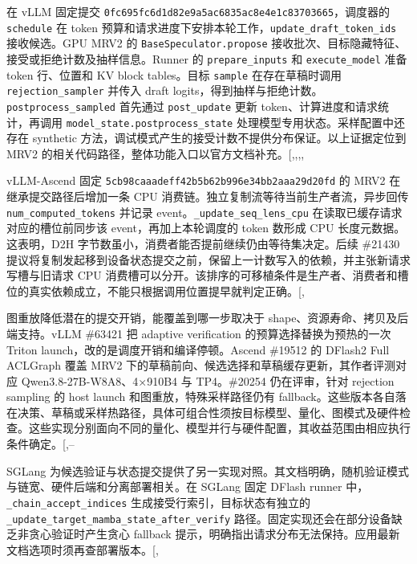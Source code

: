 \documentclass[
  a4paper,
  UTF8,
  fontset=none,
  zihao=5]{ctexart}
\begin{document}
在 vLLM 固定提交
\texttt{0fc695fc6d1d82e9a5ac6835ac8e4e1c83703665}，调度器的
\texttt{schedule} 在 token
预算和请求进度下安排本轮工作，\texttt{update\_draft\_token\_ids}
接收候选。GPU MRV2 的 \texttt{BaseSpeculator.propose}
接收批次、目标隐藏特征、接受或拒绝计数及抽样信息。Runner 的
\texttt{prepare\_inputs} 和 \texttt{execute\_model} 准备 token
行、位置和 KV block tables。目标 \texttt{sample} 在存在草稿时调用
\texttt{rejection\_sampler} 并传入 draft
logits，得到抽样与拒绝计数。\texttt{postprocess\_sampled} 首先通过
\texttt{post\_update} 更新 token、计算进度和请求统计，再调用
\texttt{model\_state.postprocess\_state}
处理模型专用状态。采样配置中还存在 synthetic
方法，调试模式产生的接受计数不提供分布保证。以上证据定位到 MRV2
的相关代码路径，整体功能入口以官方文档补充。{[},,,,\citeproc{ref-vllm-draft}{66}{]}

vLLM-Ascend 固定 \texttt{5cb98caaadeff42b5b62b996e34bb2aaa29d20fd} 的
MRV2 在继承提交路径后增加一条 CPU
消费链。独立复制流等待当前生产者流，异步回传
\texttt{num\_computed\_tokens} 并记录
event。\texttt{\_update\_seq\_lens\_cpu}
在读取已缓存请求对应的槽位前同步该 event，再加上本轮调度的 token 数形成
CPU 长度元数据。这表明，D2H
字节数虽小，消费者能否提前继续仍由等待集决定。后续 \#21430
提议将复制发起移到设备状态提交之前，保留上一计数写入的依赖，并主张新请求写槽与旧请求
CPU
消费槽可以分开。该排序的可移植条件是生产者、消费者和槽位的真实依赖成立，不能只根据调用位置提早就判定正确。{[},\citeproc{ref-pr-d2h}{31}{]}

图重放降低潜在的提交开销，能覆盖到哪一步取决于
shape、资源寿命、拷贝及后端支持。vLLM \#63421 把 adaptive verification
的预算选择替换为预热的一次 Triton
launch，改的是调度开销和编译停顿。Ascend \#19512 的 DFlash2 Full
ACLGraph 覆盖 MRV2 下的草稿前向、候选选择和草稿缓存更新，其作者评测对应
Qwen3.8-27B-W8A8、4×910B4 与 TP4。\#20254 仍在评审，针对 rejection
sampling 的 host launch 和图重放，特殊采样路径仍有
fallback。这些版本各自落在决策、草稿或采样热路径，具体可组合性须按目标模型、量化、图模式及硬件检查。这些实现分别面向不同的量化、模型并行与硬件配置，其收益范围由相应执行条件确定。{[},--\citeproc{ref-pr-sampling}{69}{]}

SGLang
为候选验证与状态提交提供了另一实现对照。其文档明确，随机验证模式与链宽、硬件后端和分离部署相关。在
SGLang 固定 DFlash runner 中，\texttt{\_chain\_accept\_indices}
生成接受行索引，目标状态有独立的
\texttt{\_update\_target\_mamba\_state\_after\_verify}
路径。固定实现还会在部分设备缺乏非贪心验证时产生贪心 fallback
提示，明确指出请求分布无法保持。应用最新文档选项时须再查部署版本。{[},\citeproc{ref-sglangdocs}{55}{]}
\end{document}
